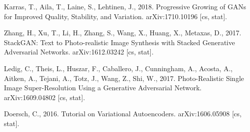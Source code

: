 \documentclass[conference]{IEEEtran}
\begin{document}
\begin{thebibliography}{00}
 Karras, T., Aila, T., Laine, S., Lehtinen, J., 2018. Progressive Growing of GANs for Improved Quality, Stability, and Variation. arXiv:1710.10196 [cs, stat].

 Zhang, H., Xu, T., Li, H., Zhang, S., Wang, X., Huang, X., Metaxas, D., 2017. StackGAN: Text to Photo-realistic Image Synthesis with Stacked Generative Adversarial Networks. arXiv:1612.03242 [cs, stat].

 Ledig, C., Theis, L., Huszar, F., Caballero, J., Cunningham, A., Acosta, A., Aitken, A., Tejani, A., Totz, J., Wang, Z., Shi, W., 2017. Photo-Realistic Single Image Super-Resolution Using a Generative Adversarial Network. arXiv:1609.04802 [cs, stat].

 Doersch, C., 2016. Tutorial on Variational Autoencoders. arXiv:1606.05908 [cs, stat].

\end{thebibliography}
\end{document}
